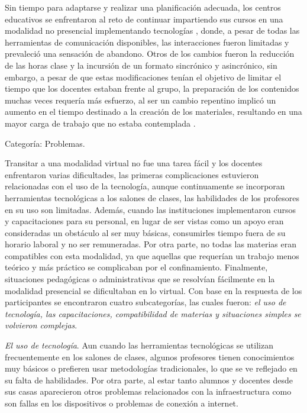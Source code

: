 \documentclass[spanish]{textolivre}
\begin{document}
Sin tiempo para adaptarse y realizar una planificación adecuada, los centros educativos se enfrentaron al reto de continuar impartiendo sus cursos en una modalidad no presencial implementando tecnologías \cite{donitsa-schmidt_opportunities_2020}, donde, a pesar de todas las herramientas de comunicación disponibles, las interacciones fueron limitadas y prevaleció una sensación de abandono. Otros de los cambios fueron la reducción de las horas clase y la incursión de un formato sincrónico y asincrónico, sin embargo, a pesar de que estas modificaciones tenían el objetivo de limitar el tiempo que los docentes estaban frente al grupo, la preparación de los contenidos muchas veces requería más esfuerzo, al ser un cambio repentino implicó un aumento en el tiempo destinado a la creación de los materiales, resultando en una mayor carga de trabajo que no estaba contemplada \cite{penuelas_ensenanza_2020}. 

Categoría: Problemas.

Transitar a una modalidad virtual no fue una tarea fácil y los docentes enfrentaron varias dificultades, las primeras complicaciones estuvieron relacionadas con el uso de la tecnología, aunque continuamente se incorporan herramientas tecnológicas a los salones de clases, las habilidades de los profesores en su uso son limitadas. Además, cuando las instituciones implementaron cursos y capacitaciones para su personal, en lugar de ser vistas como un apoyo eran consideradas un obstáculo al ser muy básicas, consumirles tiempo fuera de su horario laboral y no ser remuneradas. Por otra parte, no todas las materias eran compatibles con esta modalidad, ya que aquellas que requerían un trabajo menos teórico y más práctico se complicaban por el confinamiento. Finalmente, situaciones pedagógicas o administrativas que se resolvían fácilmente en la modalidad presencial se dificultaban en lo virtual. Con base en la respuesta de los participantes se encontraron cuatro subcategorías, las cuales fueron: \textit{el uso de tecnología, las capacitaciones, compatibilidad de materias y situaciones simples se volvieron complejas}.

\textit{El uso de tecnología}. Aun cuando las herramientas tecnológicas se utilizan frecuentemente en los salones de clases, algunos profesores tienen conocimientos muy básicos o prefieren usar metodologías tradicionales, lo que se ve reflejado en su falta de habilidades. Por otra parte, al estar tanto alumnos y docentes desde sus casas aparecieron otros problemas relacionados con la infraestructura como son fallas en los dispositivos o problemas de conexión a internet.
\end{document}
